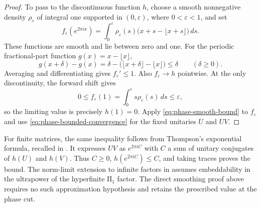 \begin{proof}
To pass to the discontinuous function $h$, choose a smooth nonnegative
density $\rho_\varepsilon$ of integral one supported in $(0,\varepsilon)$,
where $0<\varepsilon<1$, and set
\[
 f_\varepsilon(e^{2\pi ix})
 =\int_0^\varepsilon\rho_\varepsilon(s)
       \bigl(x+s-\lfloor x+s\rfloor\bigr)\,ds.
\]
These functions are smooth and lie between zero and one.
For the periodic fractional-part function $g(x)=x-\lfloor x\rfloor$,
\[
 g(x+\delta)-g(x)
 =\delta-\bigl(\lfloor x+\delta\rfloor-\lfloor x\rfloor\bigr)
 \leq\delta\qquad(\delta\geq0).
\]
Averaging and differentiating gives $f_\varepsilon'\leq1$.
Also $f_\varepsilon\to h$ pointwise.  At the only discontinuity,
the forward shift gives
\[
 0\leq f_\varepsilon(1)
 =\int_0^\varepsilon s\rho_\varepsilon(s)\,ds
 \leq\varepsilon,
\]
so the limiting value is precisely $h(1)=0$.
Apply \eqref{eq:phase-smooth-bound} to $f_\varepsilon$ and use
\eqref{eq:phase-bounded-convergence} for the fixed unitaries $U$ and $UV$.
\end{proof}

\begin{remark}
For finite matrices, the same inequality follows from Thompson's
exponential formula, recalled in
\cite[Section 2]{AntezanaLarotondaVarela2012}. It expresses $UV$ as
$e^{2\pi i C}$ with $C$ a sum of unitary conjugates of $h(U)$ and $h(V)$.
Thus $C\geq0$, $h(e^{2\pi i C})\leq C$, and taking traces proves the bound.
The norm-limit extension to infinite factors in
\cite[Theorem 4.4]{AntezanaLarotondaVarela2012} assumes embeddability in
the ultrapower of the hyperfinite $\mathrm{II}_1$ factor. The direct
smoothing proof above requires no such approximation hypothesis and
retains the prescribed value at the phase cut.
\end{remark}
